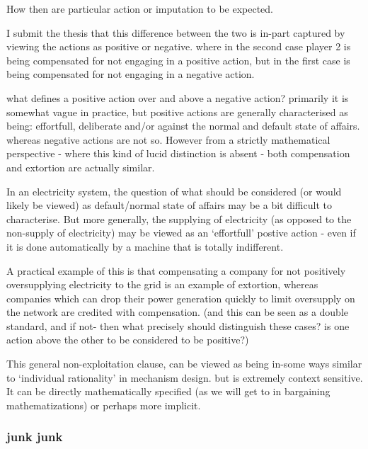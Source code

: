 How then are particular action or imputation to be expected.

I submit the thesis that this difference between the two is in-part captured by viewing the actions as positive or negative. where in the second case player 2 is being compensated for not engaging in a positive action, but in the first case is being compensated for not engaging in a negative action.

what defines a positive action over and above a negative action?
primarily it is somewhat vague in practice, but positive actions are generally characterised as being: effortfull, deliberate and/or against the normal and default state of affairs. whereas negative actions are not so.
However from a strictly mathematical perspective - where this kind of lucid distinction is absent - both compensation and extortion are actually similar.

In an electricity system, the question of what should be considered (or would likely be viewed) as default/normal state of affairs may be a bit difficult to characterise.
But more generally, the supplying of electricity (as opposed to the non-supply of electricity) may be viewed as an `effortfull' postive action - even if it is done automatically by a machine that is totally indifferent.

A practical example of this is that compensating a company for not positively oversupplying electricity to the grid is an example of extortion, whereas companies which can drop their power generation quickly to limit oversupply on the network are credited with compensation. (and this can be seen as a double standard, and if not- then what precisely should distinguish these cases? is one action above the other to be considered to be positive?)

This general non-exploitation clause, can be viewed as being in-some ways similar to `individual rationality' in mechanism design. but is extremely context sensitive.
It can be directly mathematically specified (as we will get to in bargaining mathematizations) or perhaps more implicit.




\subsubsection{junk junk}



